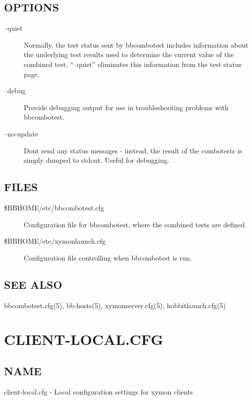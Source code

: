 \subsection{OPTIONS}
\begin{description}
\item[--quiet] Normally, the test status sent by bbcombotest includes
  information about the underlying test results used to determine the
  current value of the combined test. ``--quiet'' eliminates this
  information from the test status page. 


 

\item[--debug] Provide debugging output for use in troubleshooting problems with bbcombotest. 

 

\item[--no-update] Dont send any status messages - instead, the result of the combotests is simply dumped to stdout. Useful for debugging. 


\end{description}
\subsection{FILES}
\begin{description}
\item[\$BBHOME/etc/bbcombotest.cfg] Configuration file for bbcombotest, where the combined tests are defined 
\item[\$BBHOME/etc/xymonlaunch.cfg] Configuration file controlling when bbcombotest is run. 


\end{description}
\subsection{SEE ALSO}
bbcombotest.cfg(5), bb-hosts(5), xymonserver.cfg(5), hobbitlaunch.cfg(5) 

%
\newpage
\section{CLIENT-LOCAL.CFG}
\subsection{NAME}
 client-local.cfg - Local configuration settings for xymon clients 

